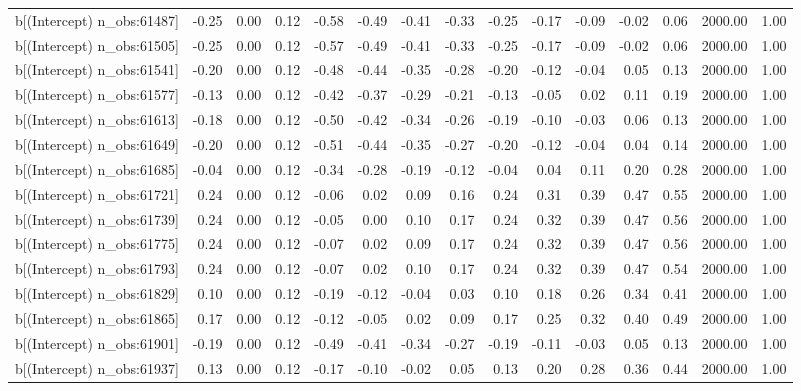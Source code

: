 \begin{table}[ht]
\begin{tabular}{rrrrrrrrrrrrrrr}
  b[(Intercept) n\_obs:61487] & -0.25 & 0.00 & 0.12 & -0.58 & -0.49 & -0.41 & -0.33 & -0.25 & -0.17 & -0.09 & -0.02 & 0.06 & 2000.00 & 1.00 \\ 
  b[(Intercept) n\_obs:61505] & -0.25 & 0.00 & 0.12 & -0.57 & -0.49 & -0.41 & -0.33 & -0.25 & -0.17 & -0.09 & -0.02 & 0.06 & 2000.00 & 1.00 \\ 
  b[(Intercept) n\_obs:61541] & -0.20 & 0.00 & 0.12 & -0.48 & -0.44 & -0.35 & -0.28 & -0.20 & -0.12 & -0.04 & 0.05 & 0.13 & 2000.00 & 1.00 \\ 
  b[(Intercept) n\_obs:61577] & -0.13 & 0.00 & 0.12 & -0.42 & -0.37 & -0.29 & -0.21 & -0.13 & -0.05 & 0.02 & 0.11 & 0.19 & 2000.00 & 1.00 \\ 
  b[(Intercept) n\_obs:61613] & -0.18 & 0.00 & 0.12 & -0.50 & -0.42 & -0.34 & -0.26 & -0.19 & -0.10 & -0.03 & 0.06 & 0.13 & 2000.00 & 1.00 \\ 
  b[(Intercept) n\_obs:61649] & -0.20 & 0.00 & 0.12 & -0.51 & -0.44 & -0.35 & -0.27 & -0.20 & -0.12 & -0.04 & 0.04 & 0.14 & 2000.00 & 1.00 \\ 
  b[(Intercept) n\_obs:61685] & -0.04 & 0.00 & 0.12 & -0.34 & -0.28 & -0.19 & -0.12 & -0.04 & 0.04 & 0.11 & 0.20 & 0.28 & 2000.00 & 1.00 \\ 
  b[(Intercept) n\_obs:61721] & 0.24 & 0.00 & 0.12 & -0.06 & 0.02 & 0.09 & 0.16 & 0.24 & 0.31 & 0.39 & 0.47 & 0.55 & 2000.00 & 1.00 \\ 
  b[(Intercept) n\_obs:61739] & 0.24 & 0.00 & 0.12 & -0.05 & 0.00 & 0.10 & 0.17 & 0.24 & 0.32 & 0.39 & 0.47 & 0.56 & 2000.00 & 1.00 \\ 
  b[(Intercept) n\_obs:61775] & 0.24 & 0.00 & 0.12 & -0.07 & 0.02 & 0.09 & 0.17 & 0.24 & 0.32 & 0.39 & 0.47 & 0.56 & 2000.00 & 1.00 \\ 
  b[(Intercept) n\_obs:61793] & 0.24 & 0.00 & 0.12 & -0.07 & 0.02 & 0.10 & 0.17 & 0.24 & 0.32 & 0.39 & 0.47 & 0.54 & 2000.00 & 1.00 \\ 
  b[(Intercept) n\_obs:61829] & 0.10 & 0.00 & 0.12 & -0.19 & -0.12 & -0.04 & 0.03 & 0.10 & 0.18 & 0.26 & 0.34 & 0.41 & 2000.00 & 1.00 \\ 
  b[(Intercept) n\_obs:61865] & 0.17 & 0.00 & 0.12 & -0.12 & -0.05 & 0.02 & 0.09 & 0.17 & 0.25 & 0.32 & 0.40 & 0.49 & 2000.00 & 1.00 \\ 
  b[(Intercept) n\_obs:61901] & -0.19 & 0.00 & 0.12 & -0.49 & -0.41 & -0.34 & -0.27 & -0.19 & -0.11 & -0.03 & 0.05 & 0.13 & 2000.00 & 1.00 \\ 
  b[(Intercept) n\_obs:61937] & 0.13 & 0.00 & 0.12 & -0.17 & -0.10 & -0.02 & 0.05 & 0.13 & 0.20 & 0.28 & 0.36 & 0.44 & 2000.00 & 1.00 \\ 

\end{tabular}
\end{table}
